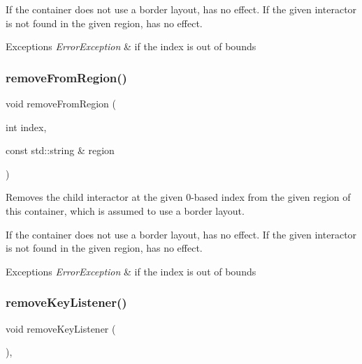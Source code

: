 If the container does not use a border layout, has no effect. If the given interactor is not found in the given region, has no effect. 
\begin{DoxyExceptions}{Exceptions}
{\em Error\+Exception} & if the index is out of bounds \\
\hline
\end{DoxyExceptions}
\mbox{\label{classsgl_1_1GContainer_ac839e32fec6ea6b37f6c6da8aa6ce43b}} 
\subsubsection{\texorpdfstring{remove\+From\+Region()}{removeFromRegion()}\hspace{0.1cm}{\footnotesize\ttfamily [6/6]}}
{\footnotesize\ttfamily void remove\+From\+Region (\begin{DoxyParamCaption}\item[{int}]{index,  }\item[{const std\+::string \&}]{region }\end{DoxyParamCaption})\hspace{0.3cm}{\ttfamily [virtual]}}



Removes the child interactor at the given 0-\/based index from the given region of this container, which is assumed to use a border layout. 

If the container does not use a border layout, has no effect. If the given interactor is not found in the given region, has no effect. 
\begin{DoxyExceptions}{Exceptions}
{\em Error\+Exception} & if the index is out of bounds \\
\hline
\end{DoxyExceptions}
\mbox{\label{classsgl_1_1GInteractor_a43095f41cab3be732b49f29970484b05}} 
\subsubsection{\texorpdfstring{remove\+Key\+Listener()}{removeKeyListener()}}
{\footnotesize\ttfamily void remove\+Key\+Listener (\begin{DoxyParamCaption}{ }\end{DoxyParamCaption})\hspace{0.3cm}{\ttfamily [virtual]}, {\ttfamily [inherited]}}



